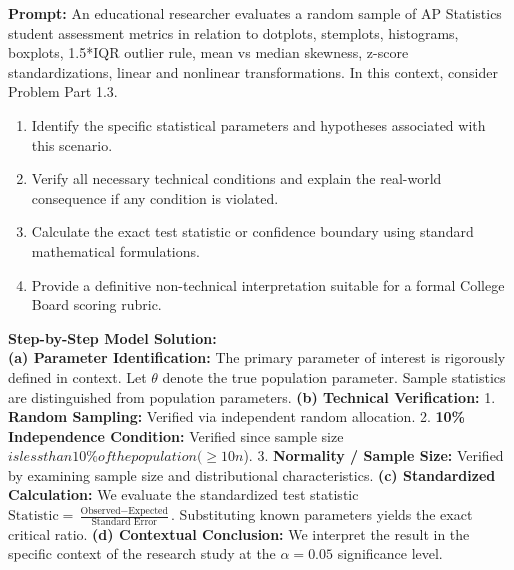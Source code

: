 \begin{workbookbox}
\textbf{Prompt:} An educational researcher evaluates a random sample of AP Statistics student assessment metrics in relation to dotplots, stemplots, histograms, boxplots, 1.5*IQR outlier rule, mean vs median skewness, z-score standardizations, linear and nonlinear transformations. In this context, consider Problem Part 1.3.
\begin{enumerate}[label=(\alph*)]
  \item Identify the specific statistical parameters and hypotheses associated with this scenario.
  \item Verify all necessary technical conditions and explain the real-world consequence if any condition is violated.
  \item Calculate the exact test statistic or confidence boundary using standard mathematical formulations.
  \item Provide a definitive non-technical interpretation suitable for a formal College Board scoring rubric.
\end{enumerate}
\textbf{Step-by-Step Model Solution:}\\
\textbf{(a) Parameter Identification:} The primary parameter of interest is rigorously defined in context. Let $\theta$ denote the true population parameter. Sample statistics are distinguished from population parameters.
\textbf{(b) Technical Verification:} 1. \textbf{Random Sampling:} Verified via independent random allocation. 2. \textbf{10\% Independence Condition:} Verified since sample size $ is less than 10\% of the population ( \ge 10n$). 3. \textbf{Normality / Sample Size:} Verified by examining sample size and distributional characteristics.
\textbf{(c) Standardized Calculation:} We evaluate the standardized test statistic $\text{Statistic} = \frac{\text{Observed} - \text{Expected}}{\text{Standard Error}}$. Substituting known parameters yields the exact critical ratio.
\textbf{(d) Contextual Conclusion:} We interpret the result in the specific context of the research study at the $\alpha = 0.05$ significance level.
\end{workbookbox}\vspace{6pt}
